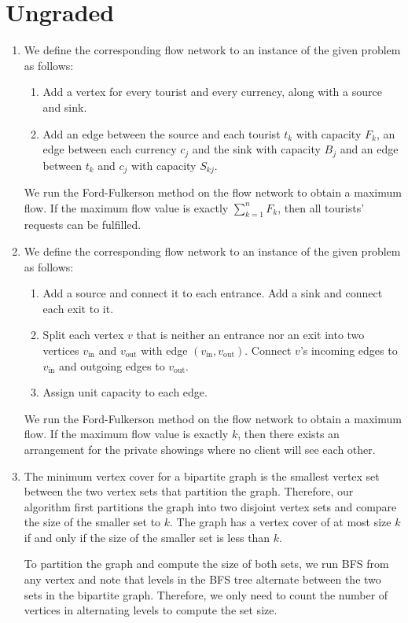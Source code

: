\documentclass{article}
\begin{document}
\section*{Ungraded}

\begin{enumerate}[resume]
    \item We define the corresponding flow network to an instance of the given problem as follows:
    \begin{enumerate}
        \item Add a vertex for every tourist and every currency, along with a source and sink.
        \item Add an edge between the source and each tourist $t_k$ with capacity $F_k$, an edge between each currency $c_j$ and the sink with capacity $B_j$ and an edge between $t_k$ and $c_j$ with capacity $S_{kj}$.
    \end{enumerate}

    We run the Ford-Fulkerson method on the flow network to obtain a maximum flow. If the maximum flow value is exactly $\sum_{k = 1}^n F_k$, then all tourists' requests can be fulfilled.

    \item We define the corresponding flow network to an instance of the given problem as follows:
    \begin{enumerate}
        \item Add a source and connect it to each entrance. Add a sink and connect each exit to it.
        \item Split each vertex $v$ that is neither an entrance nor an exit into two vertices $v_\textrm{in}$ and $v_\textrm{out}$ with edge $(v_\textrm{in}, v_\textrm{out})$. Connect $v$'s incoming edges to $v_\textrm{in}$ and outgoing edges to $v_\textrm{out}$.
        \item Assign unit capacity to each edge.
    \end{enumerate}

    We run the Ford-Fulkerson method on the flow network to obtain a maximum flow. If the maximum flow value is exactly $k$, then there exists an arrangement for the private showings where no client will see each other.

    \item The minimum vertex cover for a bipartite graph is the smallest vertex set between the two vertex sets that partition the graph. Therefore, our algorithm first partitions the graph into two disjoint vertex sets and compare the size of the smaller set to $k$. The graph has a vertex cover of at most size $k$ if and only if the size of the smaller set is less than $k$.
    
    To partition the graph and compute the size of both sets, we run BFS from any vertex and note that levels in the BFS tree alternate between the two sets in the bipartite graph. Therefore, we only need to count the number of vertices in alternating levels to compute the set size.
\end{enumerate}
\end{document}

